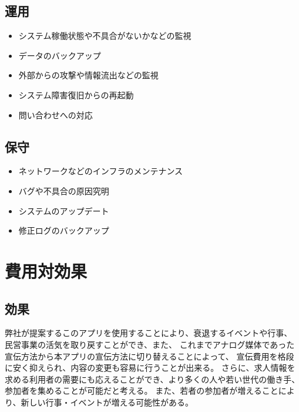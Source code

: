\documentclass[a4paper,dvipdfmx]{jarticle}
\begin{document}
\subsection{運用}
\begin{itemize}
    \item システム稼働状態や不具合がないかなどの監視
    \item データのバックアップ
    \item 外部からの攻撃や情報流出などの監視
    \item システム障害復旧からの再起動
    \item 問い合わせへの対応
\end{itemize}
\subsection{保守}
\begin{itemize}
    \item ネットワークなどのインフラのメンテナンス
    \item バグや不具合の原因究明
    \item システムのアップデート
    \item 修正ログのバックアップ
\end{itemize}
\section{費用対効果}
\subsection{効果}
弊社が提案するこのアプリを使用することにより、衰退するイベントや行事、
民営事業の活気を取り戻すことができ、また、
これまでアナログ媒体であった宣伝方法から本アプリの宣伝方法に切り替えることによって、
宣伝費用を格段に安く抑えられ、内容の変更も容易に行うことが出来る。
さらに、求人情報を求める利用者の需要にも応えることができ、より多くの人や若い世代の働き手、
参加者を集めることが可能だと考える。
また、若者の参加者が増えることにより、新しい行事・イベントが増える可能性がある。
\end{document}
